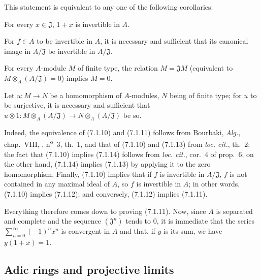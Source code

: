 This statement is equivalent to any one of the following corollaries:

\begin{corollary}[7.1.11]
\label{0.7.1.11}
For every $x\in\mathfrak J$, $1+x$ is invertible in $A$.
\end{corollary}

\begin{corollary}[7.1.12]
\label{0.7.1.12}
For $f\in A$ to be invertible in $A$, it is necessary and sufficient that its canonical
image in $A/\mathfrak J$ be invertible in $A/\mathfrak J$.
\end{corollary}

\begin{corollary}[7.1.13]
\label{0.7.1.13}
For every $A$-module $M$ of finite type, the relation $M=\mathfrak JM$
(equivalent to $M\otimes_A(A/\mathfrak J)=0$) implies $M=0$.
\end{corollary}

\begin{corollary}[7.1.14]
\label{0.7.1.14}
Let $u:M\to N$ be a homomorphism of $A$-modules, $N$ being of finite type;
for $u$ to be surjective, it is necessary and sufficient that
$u\otimes1:M\otimes_A(A/\mathfrak J)\to N\otimes_A(A/\mathfrak J)$ be so.
\end{corollary}

Indeed, the equivalence of (7.1.10) and (7.1.11) follows from Bourbaki,
\emph{Alg.}, chap.~VIII, , n\textsuperscript{o}~3, th.~1, and
that of (7.1.10) and (7.1.13) from \emph{loc. cit.}, th.~2; the fact that
(7.1.10) implies (7.1.14) follows from \emph{loc. cit.}, cor.~4 of prop.~6;
on the other hand, (7.1.14) implies (7.1.13) by applying it to the zero homomorphism.
Finally, (7.1.10) implies that if $f$ is invertible in $A/\mathfrak J$, $f$
is not contained in any maximal ideal of $A$, so $f$ is invertible in
$A$; in other words, (7.1.10) implies (7.1.12); and conversely, (7.1.12)
implies (7.1.11).

Everything therefore comes down to proving (7.1.11). Now, since $A$ is separated and complete and
the sequence $(\mathfrak J^n)$ tends to $0$, it is immediate that the series
$\sum_{n=0}^{\infty}(-1)^n x^n$ is convergent in $A$ and that, if $y$ is
its sum, we have $y(1+x)=1$.

\subsection{Adic rings and projective limits}
\label{subsection:0.7.2}

